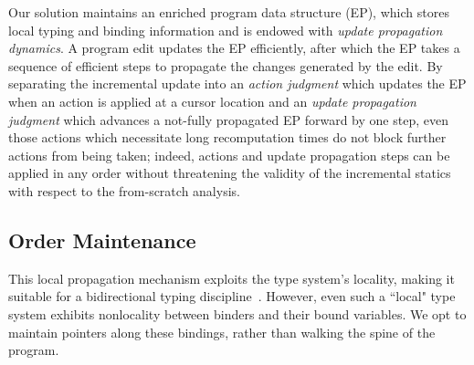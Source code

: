 \documentclass[acmsmall,dvipsnames,10pt,nonacm,sigplan]{acmart}\settopmatter{printfolios=true}
\begin{document}
Our solution maintains an enriched program data structure (EP), which stores local typing and binding information and is endowed with \textit{update propagation dynamics}. A program edit updates the EP efficiently, after which the EP takes a sequence of efficient steps to propagate the changes generated by the edit. By separating the incremental update into an \textit{action judgment} which updates the EP when an action is applied at a cursor location and an \textit{update propagation judgment} which advances a not-fully propagated EP forward by one step, even those actions which necessitate long recomputation times do not block further actions from being taken; indeed, actions and update propagation steps can be applied in any order without threatening the validity of the incremental statics with respect to the from-scratch analysis. 


\subsection*{Order Maintenance} 

This local propagation mechanism exploits the type system's locality, making it suitable for a bidirectional typing discipline~\cite{DBLP:journals/csur/DunfieldK21}. However, even such a ``local" type system exhibits nonlocality between binders and their bound variables. We opt to maintain pointers along these bindings, rather than walking the spine of the program. 


\end{document}
